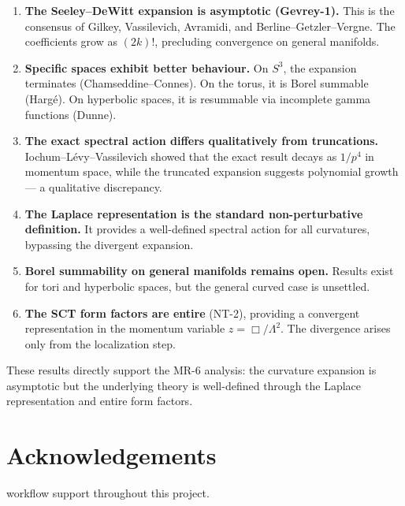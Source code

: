 \documentclass[11pt,a4paper]{article}
\newcommand{\Lam}{\Lambda}
\begin{document}
\begin{enumerate}
  \item \textbf{The Seeley--DeWitt expansion is asymptotic (Gevrey-1).}
    This is the consensus of Gilkey, Vassilevich, Avramidi, and
    Berline--Getzler--Vergne.  The coefficients grow as $(2k)!$, precluding
    convergence on general manifolds.

  \item \textbf{Specific spaces exhibit better behaviour.}
    On $S^3$, the expansion terminates (Chamseddine--Connes).
    On the torus, it is Borel summable (Harg\'{e}).
    On hyperbolic spaces, it is resummable via incomplete gamma functions
    (Dunne).

  \item \textbf{The exact spectral action differs qualitatively from
    truncations.}  Iochum--L\'{e}vy--Vassilevich showed that the exact
    result decays as $1/p^4$ in momentum space, while the truncated
    expansion suggests polynomial growth --- a qualitative discrepancy.

  \item \textbf{The Laplace representation is the standard non-perturbative
    definition.}  It provides a well-defined spectral action for all
    curvatures, bypassing the divergent expansion.

  \item \textbf{Borel summability on general manifolds remains open.}
    Results exist for tori and hyperbolic spaces, but the general curved
    case is unsettled.

  \item \textbf{The SCT form factors are entire} (NT-2), providing a
    convergent representation in the momentum variable $z = \Box/\Lam^2$.
    The divergence arises only from the localization step.
\end{enumerate}

These results directly support the MR-6 analysis: the curvature expansion
is asymptotic but the underlying theory is well-defined through the
Laplace representation and entire form factors.


\section*{Acknowledgements}

workflow support throughout this project.
\end{document}
